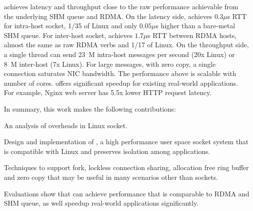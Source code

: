 
\sys{} achieves latency and throughput close to the raw performance achievable from the underlying SHM queue and RDMA.
On the latency side, \sys{} achieves $0.3\mu$s RTT for intra-host socket, 1/35 of Linux and only $0.05\mu$s higher than a bare-metal SHM queue. For inter-host socket, \sys{} achieves $1.7\mu$s RTT between RDMA hosts, almost the same as raw RDMA verbs and 1/17 of Linux.
On the throughput side, a single thread can send 23~M intra-host messages per second (20x Linux) or 8~M inter-host (7x Linux). For large messages, with zero copy, a single connection saturates NIC bandwidth.
The performance above is scalable with number of cores.
\sys{} offers significant speedup for existing real-world applications.
For example, Nginx web server has 5.5x lower HTTP request latency.

In summary, this work makes the following contributions:
\begin{ecompact}
	\item An analysis of overheads in Linux socket.
	\item Design and implementation of \sys{}, a high performance user space socket system that is compatible with Linux and preserves isolation among applications.
	\item Techniques to support fork, lockless connection sharing, allocation free ring buffer and zero copy that may be useful in many scenarios other than sockets.
	\item Evaluations show that \sys{} can achieve performance that is comparable to RDMA and SHM queue, as well speedup real-world applications significantly.
\end{ecompact}


